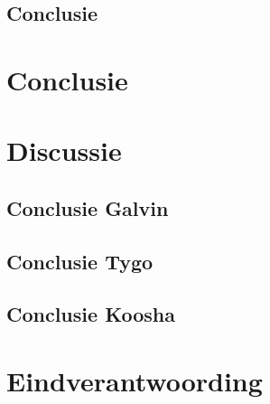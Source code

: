 \documentclass{article}
\begin{document}
\subsection{Conclusie}


	\newpage
		\section{Conclusie}
		
		
		
			\newpage
		\section{Discussie}
		
		
		\subsection{Conclusie Galvin}
		
		\subsection{Conclusie Tygo}
		
		\subsection{Conclusie Koosha}
		
		
			\newpage
		\section{Eindverantwoording}
		
		
		\newpage
	
	
\end{document}
